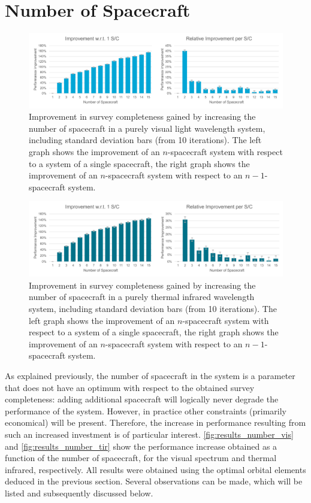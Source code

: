 \section{Number of Spacecraft}
\label{sec:results_number}

\begin{figure}[htbp]
 \centering
 \includegraphics[width=1.0\textwidth]{img/number_sc_vis.pdf}
 \caption{Improvement in survey completeness gained by increasing the number of spacecraft in a purely visual light wavelength system, including standard deviation bars (from 10 iterations). The left graph shows the improvement of an $n$-spacecraft system with respect to a system of a single spacecraft, the right graph shows the improvement of an $n$-spacecraft system with respect to an $n-1$-spacecraft system.}
 \label{fig:results_number_vis}
\end{figure}


\begin{figure}[htbp]
 \centering
 \includegraphics[width=1.0\textwidth]{img/number_sc_tir.pdf}
 \caption{Improvement in survey completeness gained by increasing the number of spacecraft in a purely thermal infrared wavelength system, including standard deviation bars (from 10 iterations). The left graph shows the improvement of an $n$-spacecraft system with respect to a system of a single spacecraft, the right graph shows the improvement of an $n$-spacecraft system with respect to an $n-1$-spacecraft system.}
 \label{fig:results_number_tir}
\end{figure}

As explained previously, the number of spacecraft in the system is a parameter that does not have an optimum with respect to the obtained survey completeness: adding additional spacecraft will logically never degrade the performance of the system. However, in practice other constraints (primarily economical) will be present. Therefore, the increase in performance resulting from such an increased investment is of particular interest. \autoref{fig:results_number_vis} and \autoref{fig:results_number_tir} show the performance increase obtained as a function of the number of spacecraft, for the visual spectrum and thermal infrared, respectively. All results were obtained using the optimal orbital elements deduced in the previous section. Several observations can be made, which will be listed and subsequently discussed below.\\

